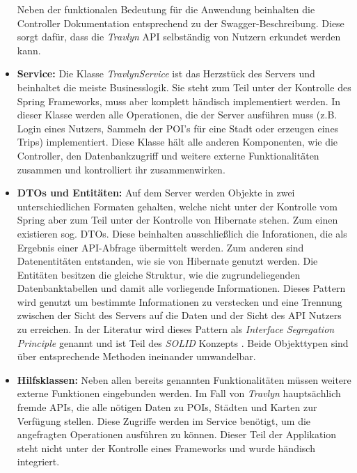 \begin{itemize}
		Neben der funktionalen Bedeutung für die Anwendung beinhalten die Controller Dokumentation entsprechend zu der Swagger-Beschreibung. Diese sorgt dafür, dass die \textit{Travlyn} API selbständig von Nutzern erkundet werden kann.
		\item  \textbf{Service:} Die Klasse \textit{TravlynService} ist das Herzstück des Servers und beinhaltet die meiste Businesslogik. Sie steht zum Teil unter der Kontrolle des Spring Frameworks, muss aber komplett händisch implementiert werden. In dieser Klasse werden alle Operationen, die der Server ausführen muss (z.B. Login eines Nutzers, Sammeln der POI's für eine Stadt oder erzeugen eines Trips) implementiert. Diese Klasse hält alle anderen Komponenten, wie die Controller, den Datenbankzugriff und weitere externe Funktionalitäten zusammen und kontrolliert ihr zusammenwirken.
		\item  \textbf{DTOs und Entitäten:} Auf dem Server werden Objekte in zwei unterschiedlichen Formaten gehalten, welche nicht unter der Kontrolle vom Spring aber zum Teil unter der Kontrolle von Hibernate stehen. Zum einen existieren sog. \ac{DTO}s. Diese beinhalten ausschließlich die Inforationen, die als Ergebnis einer API-Abfrage übermittelt werden. Zum anderen sind Datenentitäten entstanden, wie sie von Hibernate genutzt werden. Die Entitäten besitzen die gleiche Struktur, wie die zugrundeliegenden Datenbanktabellen und damit alle vorliegende Informationen. Dieses Pattern wird genutzt um bestimmte Informationen zu verstecken und eine Trennung zwischen der Sicht des Servers auf die Daten und der Sicht des API Nutzers zu erreichen. In der Literatur wird dieses Pattern als \textit{Interface Segregation Principle} genannt und ist Teil des \textit{SOLID} Konzepts \cite{GOLL.2019}. Beide Objekttypen sind über entsprechende Methoden ineinander umwandelbar.
		\item \textbf{Hilfsklassen:} Neben allen bereits genannten Funktionalitäten müssen weitere externe Funktionen eingebunden werden. Im Fall von \textit{Travlyn} hauptsächlich fremde \acs{API}s, die alle nötigen Daten zu \acs{POI}s, Städten und Karten zur Verfügung stellen. Diese Zugriffe werden im Service benötigt, um die angefragten Operationen ausführen zu können. Dieser Teil der Applikation steht nicht unter der Kontrolle eines Frameworks und wurde händisch integriert. 
	\end{itemize}
	
